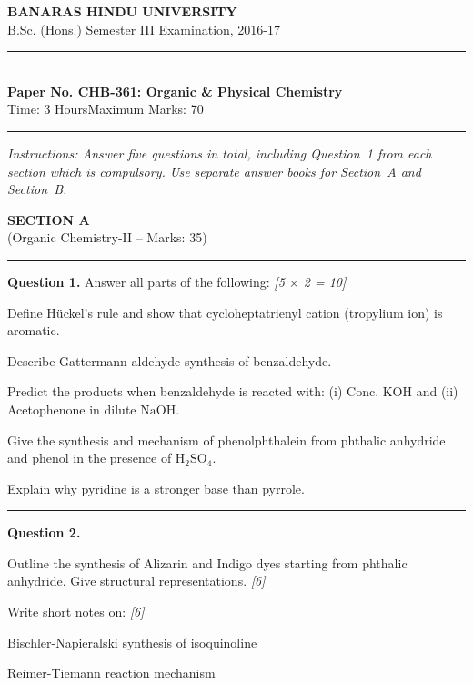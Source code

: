 \documentclass[11pt,a4paper]{article}
\newcommand{\pts}[1]{\hfill   \textit{[#1]}}
\begin{document}
\begin{center}
  {\large\bfseries BANARAS HINDU UNIVERSITY}\\[2pt]
  {\normalsize B.Sc. (Hons.) Semester III Examination, 2016-17}\\[6pt]
  \rule{0.8\linewidth}{0.5pt}\\[6pt]
  {\large\bfseries Paper No. CHB-361: Organic \& Physical Chemistry}\\[4pt]
  {\normalsize Time: 3 Hours\hfill Maximum Marks: 70}
\end{center}
\rule{\linewidth}{0.4pt}
\small



\noindent   \textit{Instructions: Answer five questions in total, including Question~1 from each section which is compulsory. Use separate answer books for Section~A and Section~B.}

\normalsize
\bigskip


\begin{center}
  {\large\bfseries SECTION A}\\[2pt]
  {\normalsize (Organic Chemistry-II -- Marks: 35)}
\end{center}
\rule{0.4\linewidth}{0.2pt}
\smallskip




\noindent   \textbf{Question 1.} Answer all parts of the following: \pts{5 $ \times$ 2 = 10}

\begin{parts}
  \item Define H\"uckel's rule and show that cycloheptatrienyl cation (tropylium ion) is aromatic.
  \item Describe Gattermann aldehyde synthesis of benzaldehyde.
  \item Predict the products when benzaldehyde is reacted with: (i) Conc. $ \text{KOH}$ and (ii) Acetophenone in dilute $ \text{NaOH}$.
  \item Give the synthesis and mechanism of phenolphthalein from phthalic anhydride and phenol in the presence of $ \text{H}_2 \text{SO}_4$.
  \item Explain why pyridine is a stronger base than pyrrole.
\end{parts}

\medskip\rule{\linewidth}{0.2pt}




\noindent   \textbf{Question 2.}

\begin{parts}
  \item Outline the synthesis of Alizarin and Indigo dyes starting from phthalic anhydride. Give structural representations. \pts{6}
  \item Write short notes on: \pts{6}
  
\begin{parts}
    \item Bischler-Napieralski synthesis of isoquinoline
    \item Reimer-Tiemann reaction mechanism
  \end{parts}
\end{parts}
\end{document}
